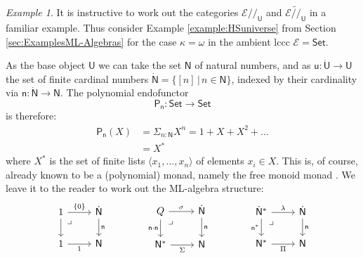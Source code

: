 \documentclass[12pt,reqno]{amsart}
\newcommand{\N}{\ensuremath{\mathbb{N}}}
\newcommand{\EE}{\ensuremath{\mathcal{E}}}
\newcommand{\Set}{\ensuremath{\mathsf{Set}}}
\newcommand{\alg}[1]{\ensuremath{\mathsf{#1}}}
\renewcommand{\to}{\ensuremath{\rightarrow}}
\renewcommand{\t}{\ensuremath{\mathsf{u}}}
\newcommand{\T}{\ensuremath{\mathsf{U}}}
\newcommand{\TT}{\ensuremath{\dot{\mathsf{U}}}}
\newcommand{\n}{\ensuremath{\mathsf{n}}}
\renewcommand{\N}{\ensuremath{\mathsf{N}}}
\newcommand{\NN}{\ensuremath{\dot{\mathsf{N}}}}
\newcommand{\pbcorner}{\arrow[dr,phantom,"\lrcorner" very near start, shift right=.5ex]} %
\theoremstyle{remark}
\newtheorem{example}[theorem]{Example}
\theoremstyle{definition}
\begin{document}
\begin{example}
It is instructive to work out the categories ${\EE/\!/}_\T$ and  ${\EE\widetilde{/\!/}}_\T$ in a familiar example. Thus consider Example \ref{example:HSuniverse} from Section \ref{sec:ExamplesML-Algebras} for the case $\kappa = \omega$ in the ambient lccc $\EE = \Set$.  

As the base object $\T$ we can take the set $\N$ of natural numbers, and as $\t:\TT\to\T$ the set of finite cardinal numbers $\NN = \{ [n]\,|\, n\in\N\}$, indexed by their cardinality via $\n : \NN \to \N$.   The polynomial endofunctor $$\alg{P}_\n : \Set \to \Set$$ is therefore:
\begin{align*}
\alg{P}_\n(X) &= \Sigma_{n:\N}X^{n} = 1 + X + X^2 + \dots \\
& = X^*
\end{align*}
where $X^*$ is the set of finite lists $\langle x_1, \dots, x_n\rangle$ of elements $x_i \in X$.   This is, of course, already known to be a (polynomial) monad, namely the free monoid monad \cite[Example 1.9]{GambinoKoch:2013}.  We leave it to the reader to work out the ML-algebra structure:
\begin{equation*}\label{diag:MLalgN}
\begin{tikzcd}
	1 \ar[r,"\{0\}"] \ar[d] \pbcorner & \NN \ar[d, "\n"]\\  
	1 \ar[r, swap,"1"] & \N
 \end{tikzcd}\qquad\qquad
 \begin{tikzcd}
	Q  \ar[r,"\sigma"] \ar[d,swap,"{\n\cdot\n}"] \pbcorner &  \NN \ar[d, "\n"]\\  
	\N^* \ar[r,swap, "\Sigma"] & \N
\end{tikzcd} \qquad\qquad
	 \begin{tikzcd}
	\NN^* \ar[d,swap,"{\n^*}"] \ar[r,"\lambda"] \pbcorner &  \NN \ar[d, "\n"]\\  
	\N^* \ar[r,swap, "\Pi"] & \N
 \end{tikzcd} 
 \end{equation*}

\end{example}
\end{document}
